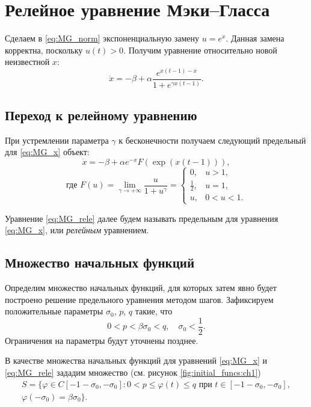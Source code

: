 \section{Релейное уравнение Мэки--Гласса}\label{sec:ch1/sec2}

Сделаем в \eqref{eq:MG_norm} экспоненциальную замену $u=e^x$. Данная замена корректна, поскольку $u(t) > 0$. Получим уравнение относительно новой неизвестной $x$:
\begin{equation}
	\label{eq:MG_x}
	\dot{x}=-\beta+\alpha\frac{e^{x(t-1)-x}}{1+e^{\gamma x(t-1)}}.
\end{equation}

\subsection{Переход к релейному уравнению}

При устремлении параметра $\gamma$ к бесконечности получаем следующий предельный для \eqref{eq:MG_x} объект:
\begin{equation}
    \label{eq:MG_rele}
    \dot{x}=-\beta + \alpha e^{-x} F(\exp({x(t-1)})),
\end{equation}
%
\begin{equation*}
    \text{где }
    F(u)=\lim\limits_{\gamma\to +\infty}\frac{u}{1+u^{\gamma}}=
    \begin{cases}
        0, & u > 1,\\
        \frac{1}{2}, & u = 1,\\
        u, & 0 < u < 1.
    \end{cases}
\end{equation*}

Уравнение \eqref{eq:MG_rele} далее будем называть предельным для уравнения \eqref{eq:MG_x}, или \emph{релейным} уравнением.

\subsection{Множество начальных функций}

Определим множество начальных функций, для которых затем явно будет построено решение предельного уравнения методом шагов. Зафиксируем положительные параметры $\sigma_0$, $p$, $q$ такие, что 
%
\[0 < p < \beta \sigma_0 < q, \quad \sigma_0 < \frac{1}{2}.\]
%
Ограничения на параметры будут уточнены позднее.

В качестве множества начальных функций для уравнений \eqref{eq:MG_x} и \eqref{eq:MG_rele} зададим множество (см. рисунок \ref{fig:initial_funcs:ch1})
\begin{multline}
    \label{eq:init_set}
    S=\{\varphi\in C[-1 - \sigma_0, -\sigma_0]: 0 < p \leqslant \varphi(t)\leqslant q \text{ при } t \in [-1 - \sigma_0, -\sigma_0],\\ \varphi(-\sigma_0) = \beta \sigma_0 \}.
\end{multline}

